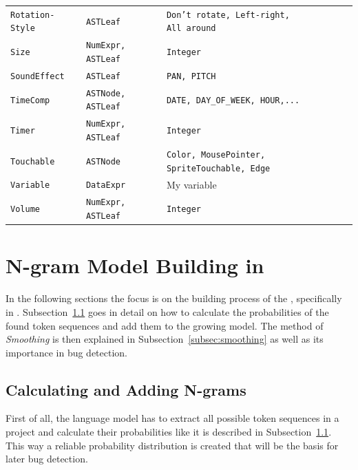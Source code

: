 \begin{table}[H]
\begin{tabular}[t]{lll}
   		\texttt{Rotation-Style} & \texttt{ASTLeaf} & \parbox[t]{7cm}{\texttt{Don't rotate, Left-right,\\ All around}} \\
   		\vspace{10pt}
    		\texttt{Size} & \texttt{NumExpr, ASTLeaf} & \texttt{Integer} \\
    		\vspace{10pt}
    		\texttt{SoundEffect} & \texttt{ASTLeaf} & \texttt{PAN, PITCH} \\
    		\vspace{10pt}
    		\texttt{TimeComp} & \texttt{ASTNode, ASTLeaf} & \texttt{DATE, DAY\_OF\_WEEK, HOUR,...} \\
    		\vspace{10pt}
    		\texttt{Timer} & \texttt{NumExpr, ASTLeaf} & \texttt{Integer} \\
    		\vspace{10pt} 
    		\texttt{Touchable} & \texttt{ASTNode} & \parbox[t]{7cm}{\texttt{Color, MousePointer, SpriteTouchable, Edge}} \\
    		\vspace{10pt}
    		\texttt{Variable} & \texttt{DataExpr} & My variable \\ 
    		\vspace{10pt}
        \texttt{Volume} & \texttt{NumExpr, ASTLeaf} & \texttt{Integer} \\     
    \bottomrule
    \end{tabular}
\end{table}


\section{N-gram Model Building in \scratch{}}\label{sec:model}
In the following sections the focus is on the building process of the \ngram{}, specifically in \scratch{}. Subsection~\ref{subsec:n-grams} goes in detail on how to calculate the probabilities of the found token sequences and add them to the growing model. The method of \textit{Smoothing} is then explained in Subsection~\ref{subsec:smoothing} as well as its importance in bug detection.

\subsection{Calculating and Adding N-grams}\label{subsec:n-grams}
First of all, the language model has to extract all possible token sequences in a \scratch{} project and calculate their probabilities like it is described in Subsection~\ref{subsec:n-grams}. This way a reliable probability distribution is created that will be the basis for later bug detection. 

